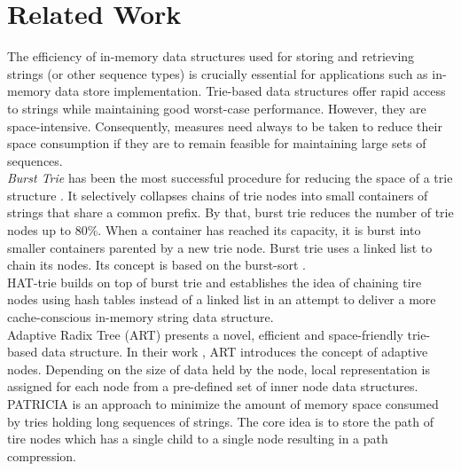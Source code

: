 \chapter{Related Work}
\label{ch:relatedword}

The efficiency of in-memory data structures used for storing and retrieving strings (or other sequence types) is crucially essential for applications such as in-memory data store implementation. 
Trie-based data structures offer rapid access to strings while
maintaining good worst-case performance. However, they are space-intensive. Consequently, measures need always to be taken to reduce their space consumption if they are to remain feasible for maintaining large sets of sequences. \\

\textit{Burst Trie} has been the most successful procedure for reducing the space of a trie structure \cite{bursttrie}. It selectively collapses chains of trie nodes into small containers of strings that share a common prefix. By that, burst trie reduces the number of trie nodes up to 80\%. When a container has reached its capacity, it is burst into smaller containers parented by a new trie node. Burst trie uses a linked list to chain its nodes. Its concept is based on the burst-sort \cite{burstsort}. \\

HAT-trie \cite{HATTRIE} builds on top of burst trie and establishes the idea of chaining tire nodes using hash tables instead of a linked list in an attempt to deliver a more cache-conscious in-memory string data structure. \\

Adaptive Radix Tree (ART) \cite{ART} presents a novel, efficient and space-friendly trie-based data structure. In their work \cite{ART}, ART introduces the concept of adaptive nodes. Depending on the size of data held by the node, local representation is assigned for each node from a pre-defined set of inner node data structures. \\

PATRICIA \cite{PATRICIA} is an approach to minimize the amount of memory space consumed by tries holding long sequences of strings. The core idea is to store the path of tire nodes which has a single child to a single node resulting in a path compression. \\	